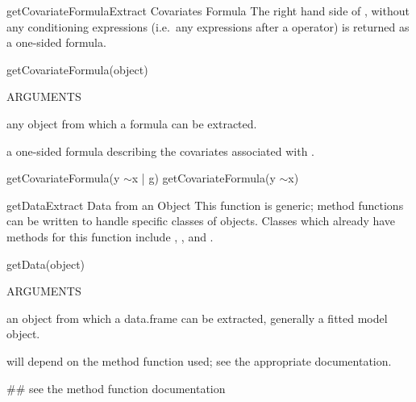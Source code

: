 \documentclass[pdftex]{article} \usepackage{url,graphicx}
\renewcommand{\Twiddle}{\mbox{\(\sim\)}}
\begin{document}
\begin{Helpfile}{getCovariateFormula}{Extract Covariates Formula}
The right hand side of , without any
conditioning expressions (i.e.\ any expressions after a \Co{|}
operator) is returned as a one-sided formula.
\begin{Example}
getCovariateFormula(object)
\end{Example}
\begin{Argument}{ARGUMENTS}
\item[\Co{object:}]
any object from which a formula can be extracted.
\end{Argument}
a one-sided formula describing the covariates associated with
.
\need 15pt
\vspace{-16pt} 
\begin{Example}
getCovariateFormula(y \Twiddle x | g)
getCovariateFormula(y \Twiddle x)
\end{Example}
\end{Helpfile}
\begin{Helpfile}{getData}{Extract Data from an Object}
This function is generic; method functions can be written to handle
specific classes of objects. Classes which already have methods for
this function include , ,
and .
\begin{Example}
getData(object)
\end{Example}
\begin{Argument}{ARGUMENTS}
\item[\Co{object:}]
an object from which a data.frame can be extracted,
generally a fitted model object.
\end{Argument}
will depend on the method function used; see the appropriate documentation.
\need 15pt
\vspace{-16pt} 
\begin{Example}
## see the method function documentation
\end{Example}
\end{Helpfile}
\end{document}
